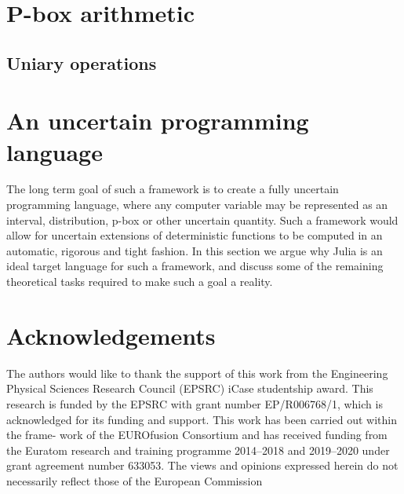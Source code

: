 \documentclass{juliacon}
\begin{document}
\section{P-box arithmetic}

\subsection{Uniary operations}



\section{An uncertain programming language}
\label{sec:additional_faci}

The long term goal of such a framework is to create a fully uncertain programming language, where any computer variable may be represented as an interval, distribution, p-box or other uncertain quantity. Such a framework would allow for uncertain extensions of deterministic functions to be computed in an automatic, rigorous and tight fashion. In this section we argue why Julia is an ideal target language for such a framework, and discuss some of the remaining theoretical tasks required to make such a goal a reality. 

\section*{Acknowledgements}

The authors would like to thank the support of this work from the Engineering Physical Sciences Research Council (EPSRC) iCase studentship award. This research is funded by the EPSRC with grant number EP/R006768/1, which is acknowledged for its funding and support. This work has been carried out within the frame- work of the EUROfusion Consortium and has received funding from the Euratom research and training programme 2014–2018 and 2019–2020 under grant agreement number 633053. The views and opinions expressed herein do not necessarily reflect those of the European Commission


\end{document}
